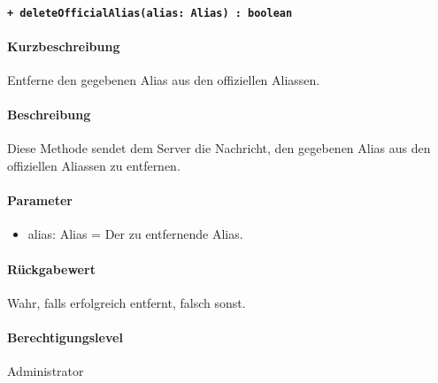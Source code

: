 \paragraph{\texttt{+ deleteOfficialAlias(alias: Alias) : boolean}}\label{AP_Backend_deleteOfficialAlias}%
\paragraph*{Kurzbeschreibung}
Entferne den gegebenen Alias aus den offiziellen Aliassen.
\paragraph*{Beschreibung}
Diese Methode sendet dem Server die Nachricht, den gegebenen Alias aus den offiziellen Aliassen zu entfernen.
\paragraph*{Parameter}
\begin{itemize}
    \item alias: Alias = Der zu entfernende Alias.
\end{itemize}
\paragraph*{Rückgabewert}
Wahr, falls erfolgreich entfernt, falsch sonst.
\paragraph*{Berechtigungslevel}
Administrator